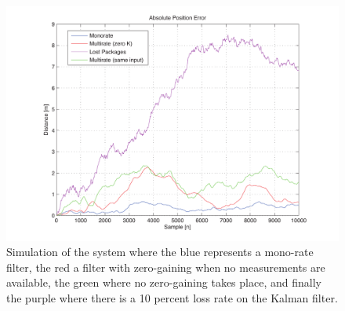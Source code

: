 \documentclass[a0,portrait]{a0poster}
\begin{document}
\begin{center}
{\begin{figure} %
\includegraphics[size=\textwidth]{img/10percent}
  \caption{Simulation of the system where the blue represents a mono-rate filter, the red a filter with zero-gaining when no measurements are available, the green where no zero-gaining takes place, and finally the purple where there is a 10 percent loss rate on the Kalman filter.}
\label{fig:trends}
\end{figure}
}
\end{center}

\makefooter
\end{document}
